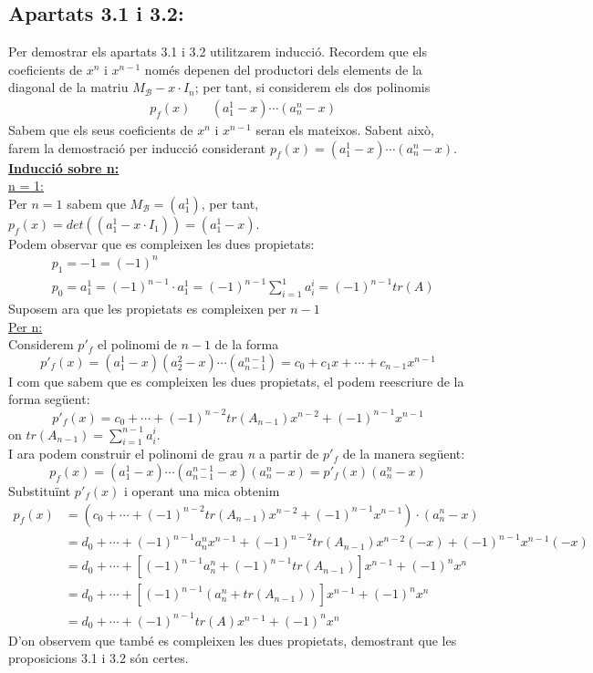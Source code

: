 \documentclass[a4paper, 11pt]{article}
\newcommand{\B}{\mathcal{B}}
\begin{document}
    \subsection*{Apartats 3.1 i 3.2:}
    Per demostrar els apartats 3.1 i 3.2 utilitzarem inducci\'o. Recordem que els coeficients de $x^n$ i $x^{n-1}$ nom\'es depenen del productori dels elements de la diagonal de la matriu $M_\B -x\cdot I_n$; per tant, si considerem els dos polinomis
    \begin{align*}
        &p_f(x) & &(a_1^1 -x)\cdots(a_n^n -x)
    \end{align*}
    Sabem que els seus coeficients de $x^n$ i $x^{n-1}$ seran els mateixos. Sabent aix\`o, farem la demostraci\'o per inducci\'o considerant $p_f(x) = (a_1^1 -x)\cdots(a_n^n -x)$.\\
    \textbf{\underline{Inducci\'o sobre n:}}\\
    \underline{n = 1:}\\
    Per $n = 1$ sabem que $M_\B = (a_1^1)$, per tant, $p_f(x) = det((a^1_1 -x\cdot I_1)) = (a_1^1 -x)$.\\
    Podem observar que es compleixen les dues propietats:
    \begin{align*}
        &p_1 = -1 = (-1)^n\\
        &p_0 = a^1_1 = (-1)^{n-1}\cdot a^1_1 = (-1)^{n-1}\sum_{i = 1}^1 a^i_i = (-1)^{n-1} tr(A)
    \end{align*}
    Suposem ara que les propietats es compleixen per $n-1$\\
    \underline{Per n:}\\
    Considerem $p'_f$ el polinomi de $n-1$ de la forma
    $$
        p'_f(x) = (a_1^1 -x)(a_2^2 -x)\cdots (a_{n-1}^{n-1}) = c_0 + c_1x + \cdots + c_{n-1}x^{n-1}
    $$
    I com que sabem que es compleixen les dues propietats, el podem reescriure de la forma seg\"uent:
    $$
        p'_f(x) = c_0 + \cdots + (-1)^{n-2} tr(A_{n-1})x^{n-2} + (-1)^{n-1}x^{n-1}
    $$
    on $tr(A_{n-1}) = \sum_{i=1}^{n-1}a_i^i$.\\
    I ara podem construir el polinomi de grau \emph{n} a partir de $p'_f$ de la manera seg\"uent:
    $$
        p_f(x) = (a_1^1 -x) \cdots (a_{n-1}^{n-1}-x)(a_n^n -x) = p'_f(x) (a_n^n -x)
    $$
    Substitu\"int $p'_f(x)$ i operant una mica obtenim
    \begin{align*}
        p_f(x) &= (c_0 + \cdots + (-1)^{n-2} tr(A_{n-1})x^{n-2} + (-1)^{n-1}x^{n-1})\cdot(a_n^n -x)\\
        &= d_0 + \cdots + (-1)^{n-1}a_n^n x^{n-1} + (-1)^{n-2} tr(A_{n-1}) x^{n-2} (-x) + (-1)^{n-1} x^{n-1} (-x)\\
        &= d_0 + \cdots + \left[ (-1)^{n-1} a_n^n + (-1)^{n-1} tr(A_{n-1}) \right] x^{n-1} + (-1)^n x^n\\
        &= d_0 + \cdots + \left[ (-1)^{n-1}(a_n^n + tr(A_{n-1})) \right] x^{n-1} + (-1)^n x^n\\
        &= d_0 + \cdots + (-1)^{n-1} tr(A) x^{n-1} + (-1)^n x^n
    \end{align*}
    D'on observem que tamb\'e es compleixen les dues propietats, demostrant que les proposicions 3.1 i 3.2 s\'on certes.
\end{document}
